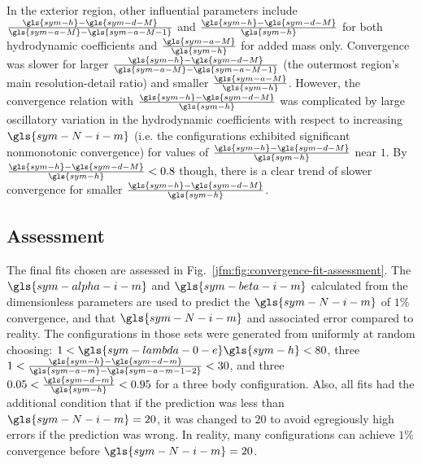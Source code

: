 \documentclass[lineno]{JFM-FLM_Au}
\begin{document}
In the exterior region, other influential parameters include $\frac{\gls{sym-h}-\gls{sym-d-M}}{\gls{sym-a-M}-\gls{sym-a-M-1}}$ and $\frac{\gls{sym-h}-\gls{sym-d-M}}{\gls{sym-h}}$ for both hydrodynamic coefficients and $\frac{\gls{sym-a-M}}{\gls{sym-h}}$ for added mass only.
Convergence was slower for larger $\frac{\gls{sym-h}-\gls{sym-d-M}}{\gls{sym-a-M}-\gls{sym-a-M-1}}$ (the outermost region's main resolution-detail ratio) and smaller $\frac{\gls{sym-a-M}}{\gls{sym-h}}$.
However, the convergence relation with $\frac{\gls{sym-h}-\gls{sym-d-M}}{\gls{sym-h}}$ was complicated by large oscillatory variation in the hydrodynamic coefficients with respect to increasing $\gls{sym-N-i-m}$ (i.e. the configurations exhibited significant nonmonotonic convergence) for values of $\frac{\gls{sym-h}-\gls{sym-d-M}}{\gls{sym-h}}$ near $1$.
By $\frac{\gls{sym-h}-\gls{sym-d-M}}{\gls{sym-h}} < 0.8$ though, there is a clear trend of slower convergence for smaller $\frac{\gls{sym-h}-\gls{sym-d-M}}{\gls{sym-h}}$.

\subsection{Assessment} \label{jfm:sec:convergence-fit-assessment}

The final fits chosen are assessed in Fig.~\ref{jfm:fig:convergence-fit-assessment}. 
The $\gls{sym-alpha-i-m}$ and $\gls{sym-beta-i-m}$ calculated from the dimensionless parameters are used to predict the $\gls{sym-N-i-m}$ of $1\%$ convergence, and that $\gls{sym-N-i-m}$ and associated error compared to reality. 
The configurations in those sets were generated from uniformly at random choosing: 
$1<\gls{sym-lambda-0-e}\gls{sym-h}<80$, three $1<\frac{\gls{sym-h}-\gls{sym-d-m}}{\gls{sym-a-m}-\gls{sym-a-m-1-2}}<30$, and three $0.05 < \frac{\gls{sym-d-m}}{\gls{sym-h}} < 0.95$ for a three body configuration. 
Also, all fits had the additional condition that if the prediction was less than $\gls{sym-N-i-m} = 20$, it was changed to $20$ to avoid egregiously high errors if the prediction was wrong. 
In reality, many configurations can achieve $1\%$ convergence before $\gls{sym-N-i-m} = 20$.
\end{document}
